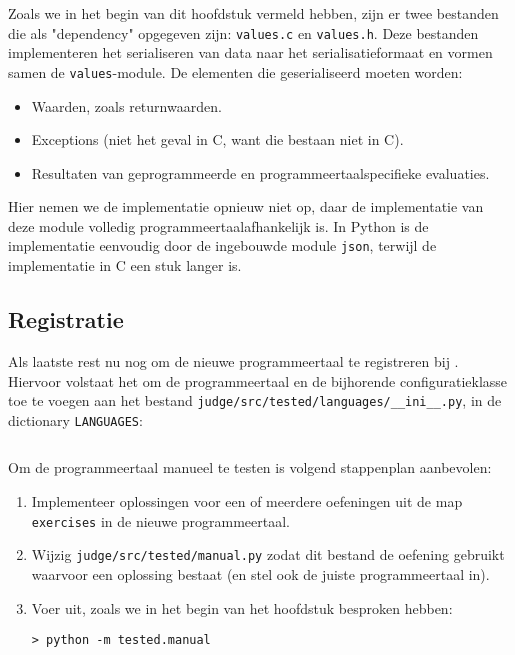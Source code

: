 Zoals we in het begin van dit hoofdstuk vermeld hebben, zijn er twee bestanden die als "dependency" opgegeven zijn: \texttt{values.c} en \texttt{values.h}.
Deze bestanden implementeren het serialiseren van data naar het serialisatieformaat en vormen samen de \texttt{values}-module.
De elementen die geserialiseerd moeten worden:

\begin{itemize}
    \item Waarden, zoals returnwaarden.
    \item Exceptions (niet het geval in C, want die bestaan niet in C).
    \item Resultaten van geprogrammeerde en programmeertaalspecifieke evaluaties.
\end{itemize}

Hier nemen we de implementatie opnieuw niet op, daar de implementatie van deze module volledig programmeertaalafhankelijk is.
In Python is de implementatie eenvoudig door de ingebouwde module \texttt{json}, terwijl de implementatie in C een stuk langer is.

\subsection{Registratie}\label{subsec:registratie}

Als laatste rest nu nog om de nieuwe programmeertaal te registreren bij \tested{}.
Hiervoor volstaat het om de programmeertaal en de bijhorende configuratieklasse toe te voegen aan het bestand \texttt{judge/src/tested/languages/\_\_ini\_\_.py}, in de dictionary \texttt{LANGUAGES}:

\inputminted[firstline=18,lastline=25]{python}{sources/languages-init.py}

Om de programmeertaal manueel te testen is volgend stappenplan aanbevolen:

\begin{enumerate}
    \item Implementeer oplossingen voor een of meerdere oefeningen uit de map \texttt{exercises} in de nieuwe programmeertaal.
    \item Wijzig \texttt{judge/src/tested/manual.py} zodat dit bestand de oefening gebruikt waarvoor een oplossing bestaat (en stel ook de juiste programmeertaal in).
    \item Voer uit, zoals we in het begin van het hoofdstuk besproken hebben:
    
    \begin{verbatim}
> python -m tested.manual
    \end{verbatim}
\end{enumerate}


